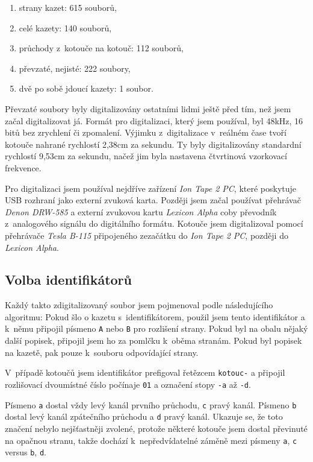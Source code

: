 \begin{enumerate}
\item{strany kazet: 615 souborů,}
\item{celé kazety: 140 souborů,}
\item{průchody z~kotouče na kotouč: 112 souborů,}
\item{převzaté, nejisté: 222 soubory,}
\item{dvě po sobě jdoucí kazety: 1 soubor.}
\end{enumerate}

Převzaté soubory byly digitalizovány ostatními lidmi ještě před tím, než jsem
začal digitalizovat já. Formát pro digitalizaci, který jsem používal, byl 48kHz,
16 bitů bez zrychlení či zpomalení. Výjimku z~digitalizace v~reálném čase tvoří
kotouče nahrané rychlostí 2,38cm za sekundu. Ty byly digitalizovány standardní
rychlostí 9,53cm za sekundu, načež jim byla nastavena čtvrtinová vzorkovací
frekvence.

Pro digitalizaci jsem používal nejdříve zařízení {\em Ion Tape 2 PC}, které
poskytuje USB rozhraní jako externí zvuková karta. Později jsem začal používat
přehrávač {\em Denon DRW-585} a externí zvukovou kartu {\em Lexicon Alpha} coby převodník
z~analogového signálu do digitálního formátu. Kotouče jsem digitalizoval pomocí
přehrávače {\em Tesla B-115} připojeného zezačátku do {\em Ion Tape 2 PC},
později do {\em Lexicon Alpha}.

\subsection{Volba identifikátorů}

Každý takto zdigitalizovaný soubor jsem pojmenoval podle následujícího
algoritmu: Pokud šlo o kazetu s~identifikátorem, použil jsem tento identifikátor
a k~němu připojil písmeno \texttt{A} nebo \texttt{B} pro rozlišení strany. Pokud
byl na obalu nějaký další popisek, připojil jsem ho za pomlčku k~oběma stranám.
Pokud byl popisek na kazetě, pak pouze k~souboru odpovídající strany.

V~případě
kotoučů jsem identifikátor prefigoval řetězcem \texttt{kotouc-} a připojil
rozlišovací dvoumístné číslo počínaje \texttt{01} a označení stopy \texttt{-a}
až \texttt{-d}.

Písmeno \texttt{a} dostal vždy levý kanál prvního průchodu, \texttt{c} pravý
kanál. Písmeno \texttt{b} dostal levý kanál zpátečního průchodu a \texttt{d}
pravý kanál. Ukazuje se, že toto značení nebylo nejšťastněji zvolené, protože
některé kotouče jsem dostal převinuté na opačnou stranu, takže dochází
k~nepředvídatelné záměně mezi písmeny \texttt{a}, \texttt{c} versus \texttt{b},
\texttt{d}.


